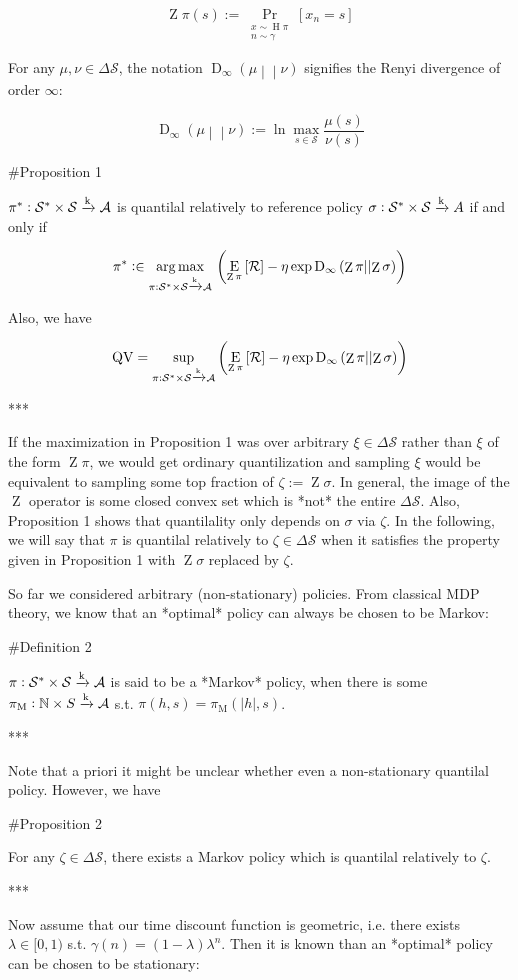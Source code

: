\documentclass[a4paper]{article}
\newcommand{\AP}[1]{\left(#1\right)}
\newcommand{\AB}[1]{\left[#1\right]}
\newcommand{\Pa}[2]{\underset{#1}{\operatorname{Pr}}\AB{#2}}
\newcommand{\Ea}[2]{\underset{#1}{\operatorname{E}}\AB{#2}}
\newcommand{\RD}[3]{\operatorname{D}_{#1}\AP{#2\middle\vert\middle\vert#3}}
\newcommand{\Argmax}[1]{\underset{#1}{\operatorname{arg\,max}}\,}
\newcommand{\Nats}{\mathbb{N}}
\newcommand{\Abs}[1]{\left\vert #1 \right\vert}
\newcommand{\K}{\xrightarrow{\textnormal{k}}}
\newcommand{\A}{\mathcal{A}}
\newcommand{\St}{\mathcal{S}}
\newcommand{\R}{\mathcal{R}}
\newcommand{\QV}{\operatorname{QV}}
\DeclareMathOperator{\Hi}{H}
\DeclareMathOperator{\Z}{Z}
\begin{document}
$$\Z{\pi}(s):=\Pa{\substack{x\sim\Hi{\pi}\\n\sim\gamma}}{x_n=s}$$

For any $\mu,\nu\in\Delta\St$, the notation $\RD{\infty}{\mu}{\nu}$ signifies the Renyi divergence of order $\infty$:

$$\RD{\infty}{\mu}{\nu} := \ln \max_{s\in\St}\frac{\mu(s)}{\nu(s)}$$

\#Proposition 1

$\pi^* : \St^*\times\St \K \A$ is quantilal relatively to reference policy $\sigma: \St^*\times\St \K A$ if and only if

$$\pi^* :\in \Argmax{\pi: \St^*\times\St \K \A}\AP{\Ea{\Z{\pi}}{\R}-\eta \exp{\RD{\infty}{\Z{\pi}}{\Z{\sigma}}}}$$

Also, we have

$$\QV = \sup_{\pi: \St^*\times\St \K \A}\AP{\Ea{\Z{\pi}}{\R}-\eta \exp{\RD{\infty}{\Z{\pi}}{\Z{\sigma}}}}$$

***

If the maximization in Proposition 1 was over arbitrary $\xi \in \Delta\St$ rather than $\xi$ of the form $\Z{\pi}$, we would get ordinary quantilization and sampling $\xi$ would be equivalent to sampling some top fraction of $\zeta:=\Z{\sigma}$. In general, the image of the $\Z$ operator is some closed convex set which is *not* the entire $\Delta\St$.  Also, Proposition 1 shows that quantilality only depends on $\sigma$ via $\zeta$. In the following, we will say that $\pi$ is quantilal relatively to $\zeta\in\Delta\St$ when it satisfies the property given in Proposition 1 with $\Z{\sigma}$ replaced by $\zeta$.

So far we considered arbitrary (non-stationary) policies. From classical MDP theory, we know that an *optimal* policy can always be chosen to be Markov:

\#Definition 2

$\pi: \St^* \times \St \K \A$ is said to be a *Markov* policy, when there is some $\pi_\text{M}: \Nats \times S \K \A$ s.t. $\pi(h,s)=\pi_\text{M}\AP{\Abs{h},s}$.

***

Note that a priori it might be unclear whether even a non-stationary quantilal policy. However, we have

\#Proposition 2

For any $\zeta\in\Delta\St$, there exists a Markov policy which is quantilal relatively to $\zeta$.

***

Now assume that our time discount function is geometric, i.e. there exists $\lambda\in[0,1)$ s.t. $\gamma(n)=(1-\lambda)\lambda^n$. Then it is known than an *optimal* policy can be chosen to be stationary:
\end{document}
